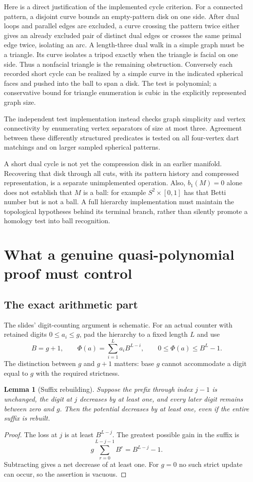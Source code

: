 \documentclass[11pt]{article}
\newtheorem{lemma}[theorem]{Lemma}
\theoremstyle{remark}\newtheorem{remark}[theorem]{Remark}
\begin{document}
Here is a direct justification of the implemented cycle criterion. For a
connected pattern, a disjoint curve bounds an empty-pattern disk on one side.
After dual loops and parallel edges are excluded, a curve crossing the pattern
twice either gives an already excluded pair of distinct dual edges or crosses
the same primal edge twice, isolating an arc. A length-three dual walk in a
simple graph must be a triangle. Its curve isolates a tripod exactly when the
triangle is facial on one side. Thus a nonfacial triangle is the remaining
obstruction. Conversely each recorded short cycle can be realized by a simple
curve in the indicated spherical faces and pushed into the ball to span a
disk. The test is polynomial; a conservative bound for triangle enumeration
is cubic in the explicitly represented graph size.

The independent test implementation instead checks graph simplicity and
vertex connectivity by enumerating vertex separators of size at most three.
Agreement between these differently structured predicates is tested on all
four-vertex dart matchings and on larger sampled spherical patterns.

A short dual cycle is not yet the compression disk in an earlier manifold.
Recovering that disk through all cuts, with its pattern history and compressed
representation, is a separate unimplemented operation. Also, $b_1(M)=0$ alone
does not establish that $M$ is a ball: for example $S^2\times[0,1]$ has that
Betti number but is not a ball. A full hierarchy implementation must maintain
the topological hypotheses behind its terminal branch, rather than silently
promote a homology test into ball recognition.

\section{What a genuine quasi-polynomial proof must control}
\subsection{The exact arithmetic part}
The slides' digit-counting argument is schematic. For an actual counter with
retained digits $0\le a_i\le g$, pad the hierarchy to a fixed length $L$ and use
\[
 B=g+1,\qquad \Phi(a)=\sum_{i=1}^L a_iB^{L-i},\qquad
 0\le\Phi(a)\le B^L-1.
\]
The distinction between $g$ and $g+1$ matters: base $g$ cannot accommodate a
digit equal to $g$ with the required strictness.

\begin{lemma}[Suffix rebuilding]
Suppose the prefix through index $j-1$ is unchanged, the digit at $j$ decreases
by at least one, and every later digit remains between zero and $g$. Then the
potential decreases by at least one, even if the entire suffix is rebuilt.
\end{lemma}
\begin{proof}
The loss at $j$ is at least $B^{L-j}$. The greatest possible gain in the suffix
is
\[
 g\sum_{r=0}^{L-j-1}B^r=B^{L-j}-1.
\]
Subtracting gives a net decrease of at least one. For $g=0$ no such strict
update can occur, so the assertion is vacuous.
\end{proof}
\end{document}
